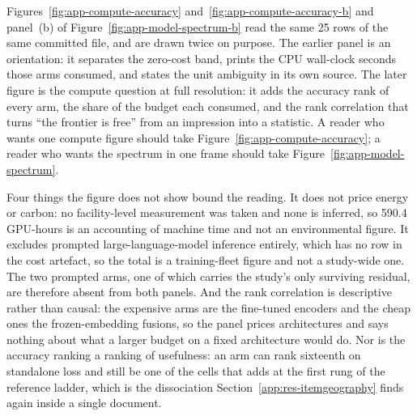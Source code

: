 Figures~\ref{fig:app-compute-accuracy} and~\ref{fig:app-compute-accuracy-b} and panel~(b) of
Figure~\ref{fig:app-model-spectrum-b} read the same 25 rows of the same
committed file, and are drawn twice on purpose. The earlier panel is an
orientation: it separates the zero-cost band, prints the CPU wall-clock
seconds those arms consumed, and states the unit ambiguity in its own source.
The later figure is the compute question at full resolution: it adds the
accuracy rank of every arm, the share of the budget each consumed, and the
rank correlation that turns ``the frontier is free'' from an impression into a
statistic. A reader who wants one compute figure should take
Figure~\ref{fig:app-compute-accuracy}; a reader who wants the spectrum in one
frame should take Figure~\ref{fig:app-model-spectrum}.

Four things the figure does not show bound the reading. It does not price
energy or carbon: no facility-level measurement was taken and none is
inferred, so 590.4 GPU-hours is an accounting of machine time and not an
environmental figure. It excludes prompted large-language-model inference
entirely, which has no row in the cost artefact, so the total is a
training-fleet figure and not a study-wide one. The two prompted arms,
one of which carries the study's only surviving residual, are therefore absent
from both panels. And the rank correlation is descriptive rather than causal:
the expensive arms are the fine-tuned encoders and the cheap ones the
frozen-embedding fusions, so the panel prices architectures and says nothing
about what a larger budget on a fixed architecture would do. Nor is the
accuracy ranking a ranking of usefulness: an arm can rank sixteenth on
standalone loss and still be one of the cells that adds at the first rung of
the reference ladder, which is the dissociation Section~\ref{app:res-itemgeography}
finds again inside a single document.


